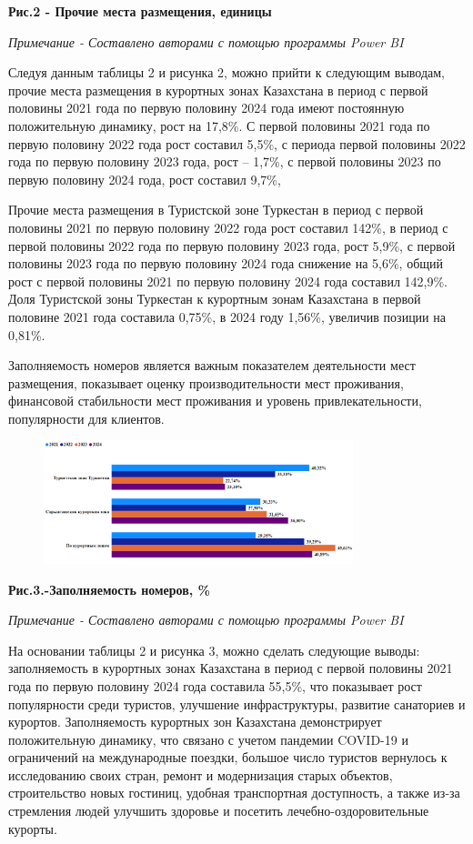 {\bfseries Рис.2 - Прочие места размещения, единицы}

\emph{Примечание - Составлено авторами с помощью программы Power BI}

Следуя данным таблицы 2 и рисунка 2, можно прийти к следующим выводам,
прочие места размещения в курортных зонах Казахстана в период с первой
половины 2021 года по первую половину 2024 года имеют постоянную
положительную динамику, рост на 17,8\%. С первой половины 2021 года по
первую половину 2022 года рост составил 5,5\%, с периода первой половины
2022 года по первую половину 2023 года, рост -- 1,7\%, с первой половины
2023 по первую половину 2024 года, рост составил 9,7\%,

Прочие места размещения в Туристской зоне Туркестан в период с первой
половины 2021 по первую половину 2022 года рост составил 142\%, в период
с первой половины 2022 года по первую половину 2023 года, рост 5,9\%, с
первой половины 2023 года по первую половину 2024 года снижение на
5,6\%, общий рост с первой половины 2021 по первую половину 2024 года
составил 142,9\%. Доля Туристской зоны Туркестан к курортным зонам
Казахстана в первой половине 2021 года составила 0,75\%, в 2024 году
1,56\%, увеличив позиции на 0,81\%.

Заполняемость номеров является важным показателем деятельности мест
размещения, показывает оценку производительности мест проживания,
финансовой стабильности мест проживания и уровень привлекательности,
популярности для клиентов.

\begin{figure}[H]
	\centering
	\includegraphics[width=0.8\textwidth]{media/ekon/image5}
	\caption*{}
\end{figure}


{\bfseries Рис.3.-Заполняемость номеров, \%}

\emph{Примечание - Составлено авторами с помощью программы Power BI}

На основании таблицы 2 и рисунка 3, можно сделать следующие выводы:
заполняемость в курортных зонах Казахстана в период с первой половины
2021 года по первую половину 2024 года составила 55,5\%, что показывает
рост популярности среди туристов, улучшение инфраструктуры, развитие
санаториев и курортов. Заполняемость курортных зон Казахстана
демонстрирует положительную динамику, что связано с учетом пандемии
COVID-19 и ограничений на международные поездки, большое число туристов
вернулось к исследованию своих стран, ремонт и модернизация старых
объектов, строительство новых гостиниц, удобная транспортная
доступность, а также из-за стремления людей улучшить здоровье и посетить
лечебно-оздоровительные курорты.

